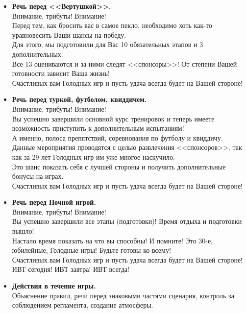 
\begin{itemize}
\item \textbf{Речь перед <<Вертушкой>>.}\\
Внимание, трибуты! Внимание!\\
Перед тем, как бросить вас в самое пекло, необходимо хоть как-то уравновесить Ваши шансы на победу.\\
Для этого, мы подготовили для Вас 10 обязательных этапов и 3 дополнительных.\\
Все 13 оцениваются и за ними следят <<спонсоры>>! От степени Вашей готовности зависит Ваша жизнь!\\
Счастливых вам Голодных игр и пусть удача всегда будет на Вашей стороне!

\item \textbf{Речь перед туркой, футболом, квиддичем.}\\
Внимание, трибуты! Внимание!\\
Вы успешно завершили основной курс тренировок и теперь имеете возможность приступить к дополнительным испытаниям!\\
А именно, полоса препятствий, соревнования по футболу и квиддичу.\\
Данные мероприятия проводятся с целью развлечения <<спонсоров>>, так как за 29 лет Голодных игр им уже многое наскучило.\\
Это шанс показать себя с лучшей стороны и получить дополнительные бонусы на играх.\\
Счастливых вам Голодных игр и пусть удача всегда будет на Вашей стороне!

\item \textbf{Речь перед Ночной игрой.}\\
Внимание, трибуты! Внимание!\\
Вы успешно завершили все этапы (подготовки)! Время отдыха и подготовки вышло!\\
Настало время показать на что вы способны! И помните! Это 30-е, юбилейные, Голодные игры! Будьте готовы ко всему!\\
Счастливых вам Голодных игр и пусть удача всегда будет на Вашей стороне!\\
ИВТ сегодня! ИВТ завтра! ИВТ всегда!

\item \textbf{Действия в течение игры.}\\
Объяснение правил, речи перед знаковыми частями сценария, контроль за соблюдением регламента, создание атмосферы.
\end{itemize}